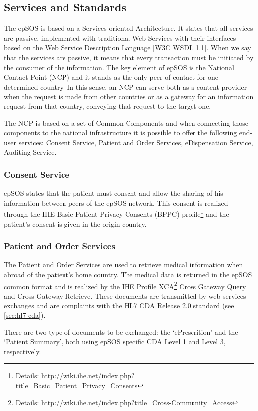 \subsection{Services and Standards}

The epSOS is based on a Services-oriented Architecture. It states that all services are passive, implemented with traditional Web Services with their interfaces based on the Web Service Description Language [W3C WSDL 1.1]. When we say that the services are passive, it means that every transaction must be initiated by the consumer of the information.
The key element of epSOS is the National Contact Point (NCP) and it stands as the only peer of contact for one determined country. In this sense, an NCP can serve both as a content provider when the request is made from other countries or as a gateway for an information request from that country, conveying that request to the target one.

The NCP is based on a set of Common Components and when connecting those components to the national infrastructure it is possible to offer the following end-user services: Consent Service, Patient and Order Services, eDispensation Service, Auditing Service.

\subsubsection{Consent Service}
epSOS states that the patient must consent and allow the sharing of his information between peers of the epSOS network. This consent is realized through the IHE Basic Patient Privacy Consents (BPPC) profile\footnote{Details: \url{http://wiki.ihe.net/index.php?title=Basic_Patient_Privacy_Consents}} and the patient's consent is given in the origin country.

\subsubsection{Patient and Order Services}
The Patient and Order Services are used to retrieve medical information when abroad of the patient's home country. The medical data is returned in the epSOS common format and is realized by the IHE Profile XCA\footnote{Details: \url{http://wiki.ihe.net/index.php?title=Cross-Community_Access}} Cross Gateway Query and Cross Gateway Retrieve. These documents are transmitted by web services exchanges and are complaints with the HL7 CDA Release 2.0 standard (see \ref{sec:hl7-cda}).

There are two type of documents to be exchanged: the `ePrescrition' and the `Patient Summary', both using epSOS specific CDA Level 1 and Level 3, respectively.

